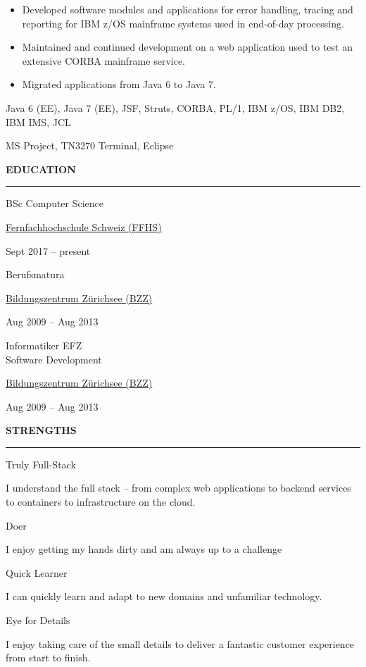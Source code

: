 \documentclass[11pt, a4paper, ragged2e, withhyper]{altacv}
\renewcommand{\cvsectionfont}{\Large\sffamily\bfseries}
\newcommand{\cveventbreak}[4]{%
  {\Large\color{emphasis}#1\par}
  \medskip\normalsize
  \ifstrequal{#2}{}{}{
  	{#2}}\par
  \ifstrequal{#3}{}{}{{
  	{#3}}}\par
  \ifstrequal{#4}{}{}{{
  	{#4}}}\par
  \medskip\normalsize
}
\newcommand{\cvstrength}[2]{
	{\Large\color{emphasis}#1\par}
  \medskip\normalsize
  {#2}\par
}
\renewcommand{\cvsection}[2][]{%
  \bigskip%
  \ifstrequal{#1}{}{}{\marginpar{\vspace*{\dimexpr1pt-\baselineskip}\raggedright}}%
  {\color{heading}\cvsectionfont\MakeUppercase{#2}}\\%
  {\color{headingrule}\rule{\linewidth}{0.5pt}\par}\bigskip
}
\begin{document}
\begin{paracol}{2}
	\bigskip
	\begin{itemize}[label=\color{bullet}\textbullet]
		\item Developed software modules and applications for error handling, tracing and reporting for IBM z/OS mainframe systems used in end-of-day processing.
		\item Maintained and continued development on a web application used to test an extensive CORBA mainframe service.
		\item Migrated applications from Java 6 to Java 7.
	\end{itemize}

	\bigskip
	\begin{description}
		\small
		\item [Technologies:] Java 6 (EE), Java 7 (EE), JSF, Struts, CORBA, PL/1, IBM z/OS, IBM DB2, IBM IMS, JCL
		\item [Tools:] MS Project, TN3270 Terminal, Eclipse
	\end{description}
		
	\switchcolumn
	
	\cvsection{Education}
	\cveventbreak{BSc Computer Science}{\href{https://www.ffhs.ch/}{Fernfachhochschule Schweiz (FFHS)}}{Sept 2017 -- present}{}

	\bigskip
	\cveventbreak{Berufsmatura}{\href{https://www.bzz.ch/}{Bildungszentrum Zürichsee (BZZ)}}{Aug 2009 -- Aug 2013}{}

	\bigskip
	\cveventbreak{Informatiker EFZ \\\small{Software Development}}{\href{https://www.bzz.ch/}{Bildungszentrum Zürichsee (BZZ)}}{Aug 2009 -- Aug 2013}{}

	\cvsection{Strengths}
	\cvstrength{Truly Full-Stack}{I understand the full stack -- from complex web applications to backend services to containers to infrastructure on the cloud.}

	\bigskip
	\cvstrength{Doer}{I enjoy getting my hands dirty and am always up to a challenge}

	\bigskip
	\cvstrength{Quick Learner}{I can quickly learn and adapt to new domains and unfamiliar technology.}
	
	\bigskip
	\cvstrength{Eye for Details}{I enjoy taking care of the small details to deliver a fantastic customer experience from start to finish.}


\end{paracol}
\end{document}
